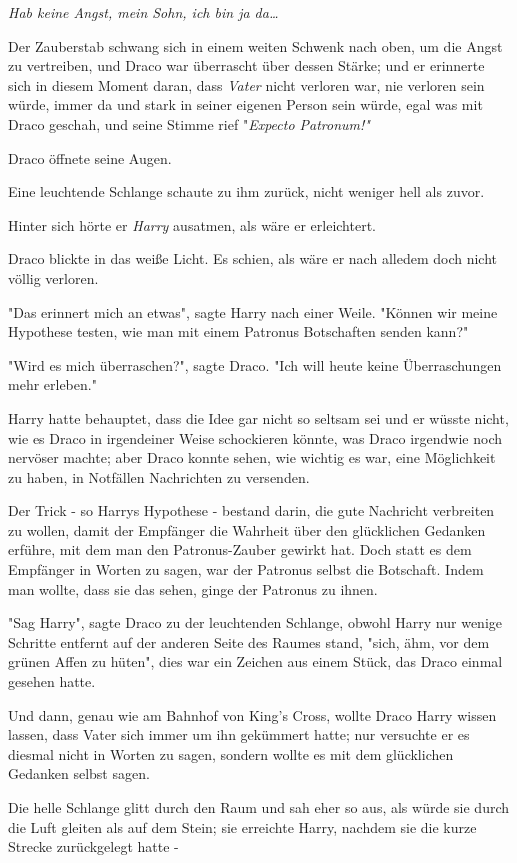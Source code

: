 {\emph{Hab keine Angst, mein Sohn, ich bin ja da…}

Der Zauberstab schwang sich in einem weiten Schwenk nach oben, um die Angst zu vertreiben, und Draco war überrascht über dessen Stärke; und er erinnerte sich in diesem Moment daran, dass \emph{Vater} nicht verloren war, nie verloren sein würde, immer da und stark in seiner eigenen Person sein würde, egal was mit Draco geschah, und seine Stimme rief "\emph{Expecto Patronum!"}

Draco öffnete seine Augen.

Eine leuchtende Schlange schaute zu ihm zurück, nicht weniger hell als zuvor.

Hinter sich hörte er \emph{Harry} ausatmen, als wäre er erleichtert.

Draco blickte in das weiße Licht. Es schien, als wäre er nach alledem doch nicht völlig verloren.

"Das erinnert mich an etwas", sagte Harry nach einer Weile. "Können wir meine Hypothese testen, wie man mit einem Patronus Botschaften senden kann?"

"Wird es mich überraschen?", sagte Draco. "Ich will heute keine Überraschungen mehr erleben."

Harry hatte behauptet, dass die Idee gar nicht so seltsam sei und er wüsste nicht, wie es Draco in irgendeiner Weise schockieren könnte, was Draco irgendwie noch nervöser machte; aber Draco konnte sehen, wie wichtig es war, eine Möglichkeit zu haben, in Notfällen Nachrichten zu versenden.

Der Trick - so Harrys Hypothese - bestand darin, die gute Nachricht verbreiten zu wollen, damit der Empfänger die Wahrheit über den glücklichen Gedanken erführe, mit dem man den Patronus-Zauber gewirkt hat. Doch statt es dem Empfänger in Worten zu sagen, war der Patronus selbst die Botschaft. Indem man wollte, dass sie das sehen, ginge der Patronus zu ihnen.

"Sag Harry", sagte Draco zu der leuchtenden Schlange, obwohl Harry nur wenige Schritte entfernt auf der anderen Seite des Raumes stand, "sich, ähm, vor dem grünen Affen zu hüten", dies war ein Zeichen aus einem Stück, das Draco einmal gesehen hatte.

Und dann, genau wie am Bahnhof von King's Cross, wollte Draco Harry wissen lassen, dass Vater sich immer um ihn gekümmert hatte; nur versuchte er es diesmal nicht in Worten zu sagen, sondern wollte es mit dem glücklichen Gedanken selbst sagen.

Die helle Schlange glitt durch den Raum und sah eher so aus, als würde sie durch die Luft gleiten als auf dem Stein; sie erreichte Harry, nachdem sie die kurze Strecke zurückgelegt hatte -

}
